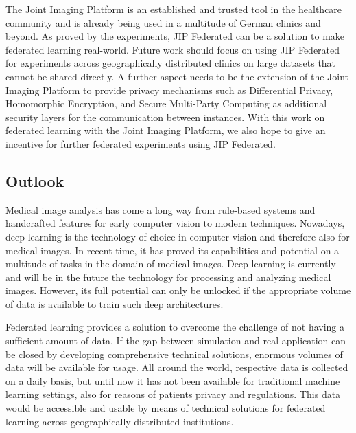 The Joint Imaging Platform is an established and trusted tool in the healthcare community and is already being used in a multitude of German clinics and beyond.
As proved by the experiments, JIP Federated can be a solution to make federated learning real-world.
Future work should focus on using JIP Federated for experiments across  geographically distributed clinics on large datasets that cannot be shared directly.
A further aspect needs to be the extension of the Joint Imaging Platform to provide privacy mechanisms such as Differential Privacy, Homomorphic Encryption, and Secure Multi-Party Computing as additional security layers for the communication between instances.
With this work on federated learning with the Joint Imaging Platform, we also hope to give an incentive for further federated experiments using JIP Federated.

\subsection{Outlook}
\label{subsec:Outlook}

Medical image analysis has come a long way from rule-based systems and handcrafted features for early computer vision to modern techniques. Nowadays, deep learning is the technology of choice in computer vision and therefore also for medical images. In recent time, it has proved its capabilities and potential on a multitude of tasks in the domain of medical images. Deep learning is currently and will be in the future the technology for processing and analyzing medical images. However, its full potential can only be unlocked if the appropriate volume of data is available to train such deep architectures.

Federated learning provides a solution to overcome the challenge of not having a sufficient amount of data. If the gap between simulation and real application can be closed by developing comprehensive technical solutions, enormous volumes of data will be available for usage. All around the world, respective data is collected on a daily basis, but until now it has not been available for traditional machine learning settings, also for reasons of patients privacy and regulations. This data would be accessible and usable by means of technical solutions for federated learning across geographically distributed institutions.

